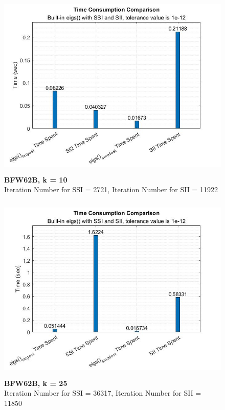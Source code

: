 \documentclass[12pt]{article}
\begin{document}
\begin{figure}[H]
	\centerline{\includegraphics[height=9cm, width=12cm]{plot10bfw.jpg}}
	\caption{\textbf{BFW62B, k = 10} \\ Iteration Number for SSI = 2721, Iteration Number for SII = 11922}
	\label{fig9}
\end{figure}

\begin{figure}[H]
	\centerline{\includegraphics[height=9cm, width=12cm]{plot25bfw.jpg}}
	\caption{\textbf{BFW62B, k = 25} \\ Iteration Number for SSI = 36317, Iteration Number for SII = 11850}
	\label{fig10}
\end{figure}
\end{document}

